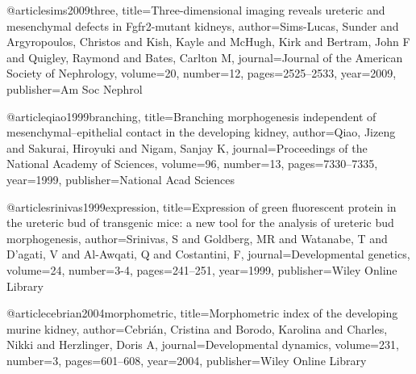 @article{sims2009three,
  title={Three-dimensional imaging reveals ureteric and mesenchymal defects in Fgfr2-mutant kidneys},
  author={Sims-Lucas, Sunder and Argyropoulos, Christos and Kish, Kayle and McHugh, Kirk and Bertram, John F and Quigley, Raymond and Bates, Carlton M},
  journal={Journal of the American Society of Nephrology},
  volume={20},
  number={12},
  pages={2525--2533},
  year={2009},
  publisher={Am Soc Nephrol}
}

@article{qiao1999branching,
  title={Branching morphogenesis independent of mesenchymal--epithelial contact in the developing kidney},
  author={Qiao, Jizeng and Sakurai, Hiroyuki and Nigam, Sanjay K},
  journal={Proceedings of the National Academy of Sciences},
  volume={96},
  number={13},
  pages={7330--7335},
  year={1999},
  publisher={National Acad Sciences}
}

@article{srinivas1999expression,
  title={Expression of green fluorescent protein in the ureteric bud of transgenic mice: a new tool for the analysis of ureteric bud morphogenesis},
  author={Srinivas, S and Goldberg, MR and Watanabe, T and D'agati, V and Al-Awqati, Q and Costantini, F},
  journal={Developmental genetics},
  volume={24},
  number={3-4},
  pages={241--251},
  year={1999},
  publisher={Wiley Online Library}
}

@article{cebrian2004morphometric,
  title={Morphometric index of the developing murine kidney},
  author={Cebri{\'a}n, Cristina and Borodo, Karolina and Charles, Nikki and Herzlinger, Doris A},
  journal={Developmental dynamics},
  volume={231},
  number={3},
  pages={601--608},
  year={2004},
  publisher={Wiley Online Library}
}
